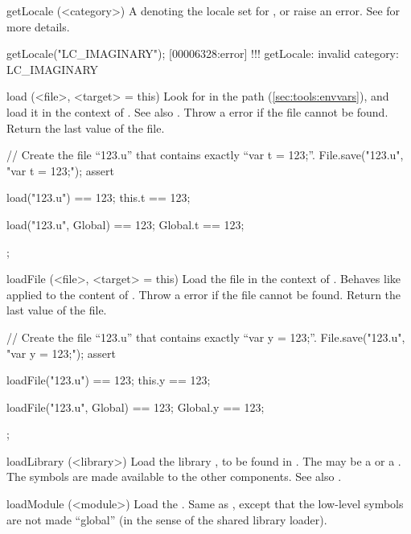 \begin{urbiscriptapi}
\item[getLocale](<category>)%
  A  denoting the locale set for , or
  raise an error.  See  for more details.
\begin{urbiscript}
getLocale("LC_IMAGINARY");
[00006328:error] !!! getLocale: invalid category: LC_IMAGINARY
\end{urbiscript}


\item[load](<file>, <target> = this)%
  Look for  in the \urbi path (\autoref{sec:tools:envvars}), and
  load it in the context of .  See also .
  Throw a  error if the file cannot be
  found.  Return the last value of the file.
\begin{urbiscript}
// Create the file ``123.u'' that contains exactly ``var t = 123;''.
File.save("123.u", "var t = 123;");
assert
{
  load("123.u") == 123;
  this.t == 123;

  load("123.u", Global) == 123;
  Global.t == 123;
};
\end{urbiscript}


\item[loadFile](<file>, <target> = this)%
  Load the \us file  in the context of .  Behaves like
   applied to the content of .  Throw a
   error if the file cannot be found.
  Return the last value of the file.
\begin{urbiscript}
// Create the file ``123.u'' that contains exactly ``var y = 123;''.
File.save("123.u", "var y = 123;");
assert
{
  loadFile("123.u") == 123;
  this.y == 123;

  loadFile("123.u", Global) == 123;
  Global.y == 123;
};

\end{urbiscript}


\item[loadLibrary](<library>)%
  Load the library , to be found in
  .  The  may be a
   or a .  The \Cxx symbols are made
  available to the other \Cxx components.  See also .


\item[loadModule](<module>)%
  Load the \UObject {}.  Same as , except
  that the low-level \Cxx symbols are not made ``global'' (in the sense of
  the shared library loader).



\end{urbiscriptapi}
